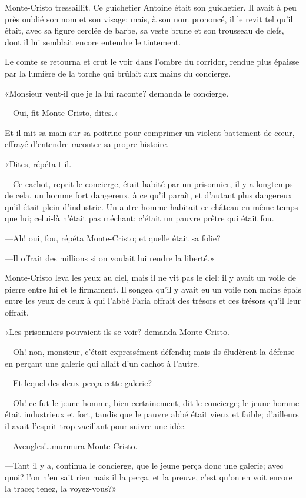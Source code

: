 Monte-Cristo tressaillit. Ce guichetier Antoine était son guichetier. Il avait à peu près oublié son nom et son visage; mais, à son nom prononcé, il le revit tel qu'il était, avec sa figure cerclée de barbe, sa veste brune et son trousseau de clefs, dont il lui semblait encore entendre le tintement. 

Le comte se retourna et crut le voir dans l'ombre du corridor, rendue plus épaisse par la lumière de la torche qui brûlait aux mains du concierge. 

«Monsieur veut-il que je la lui raconte? demanda le concierge. 

—Oui, fit Monte-Cristo, dites.» 

Et il mit sa main sur sa poitrine pour comprimer un violent battement de cœur, effrayé d'entendre raconter sa propre histoire. 

«Dites, répéta-t-il. 

—Ce cachot, reprit le concierge, était habité par un prisonnier, il y a longtemps de cela, un homme fort dangereux, à ce qu'il paraît, et d'autant plus dangereux qu'il était plein d'industrie. Un autre homme habitait ce château en même temps que lui; celui-là n'était pas méchant; c'était un pauvre prêtre qui était fou. 

—Ah! oui, fou, répéta Monte-Cristo; et quelle était sa folie? 

—Il offrait des millions si on voulait lui rendre la liberté.» 

Monte-Cristo leva les yeux au ciel, mais il ne vit pas le ciel: il y avait un voile de pierre entre lui et le firmament. Il songea qu'il y avait eu un voile non moins épais entre les yeux de ceux à qui l'abbé Faria offrait des trésors et ces trésors qu'il leur offrait. 

«Les prisonniers pouvaient-ils se voir? demanda Monte-Cristo. 

—Oh! non, monsieur, c'était expressément défendu; mais ils éludèrent la défense en perçant une galerie qui allait d'un cachot à l'autre. 

—Et lequel des deux perça cette galerie? 

—Oh! ce fut le jeune homme, bien certainement, dit le concierge; le jeune homme était industrieux et fort, tandis que le pauvre abbé était vieux et faible; d'ailleurs il avait l'esprit trop vacillant pour suivre une idée. 

—Aveugles!\dots murmura Monte-Cristo. 

—Tant il y a, continua le concierge, que le jeune perça donc une galerie; avec quoi? l'on n'en sait rien mais il la perça, et la preuve, c'est qu'on en voit encore la trace; tenez, la voyez-vous?» 


